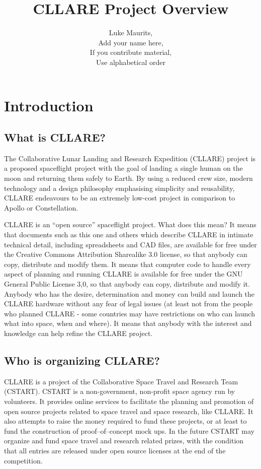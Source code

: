 \documentclass{report}
\author{Luke Maurits, \\
Add your name here, \\
If you contribute material, \\
Use alphabetical order}
\title{CLLARE Project Overview}
\begin{document}
\maketitle
\tableofcontents

\chapter{Introduction}

\section{What is CLLARE?}

The Collaborative Lunar Landing and Research Expedition (CLLARE) project is a proposed spaceflight project with the goal of landing a single human on the moon and returning them safely to Earth.  By using a reduced crew size, modern technology and a design philosophy emphasising simplicity and reusability, CLLARE endeavours to be an extremely low-cost project in comparison to Apollo or Constellation.

CLLARE is an ``open source'' spaceflight project.  What does this mean?  It means that documents such as this one and others which describe CLLARE in intimate technical detail, including spreadsheets and CAD files, are available for free under the Creative Commons Attribution Sharealike 3.0 license, so that anybody can copy, distribute and modify them.  It means that computer code to handle every aspect of planning and running CLLARE is available for free under the GNU General Public License 3,0, so that anybody can copy, distribute and modify it.  Anybody who has the desire, determination and money can build and launch the CLLARE hardware without any fear of legal issues (at least not from the people who planned CLLARE - some countries may have restrictions on who can launch what into space, when and where).  It means that anybody with the interest and knowledge can help refine the CLLARE project.

\section{Who is organizing CLLARE?}

CLLARE is a project of the Collaborative Space Travel and Research Team (CSTART).  CSTART is a non-government, non-profit space agency run by volunteers.  It provides online services to facilitate the planning and promotion of open source projects related to space travel and space research, like CLLARE.  It also attempts to raise the money required to fund these projects, or at least to fund the construction of proof--of--concept mock ups.  In the future CSTART may organize and fund space travel and research related prizes, with the condition that all entries are released under open source licenses at the end of the competition.
\end{document}
